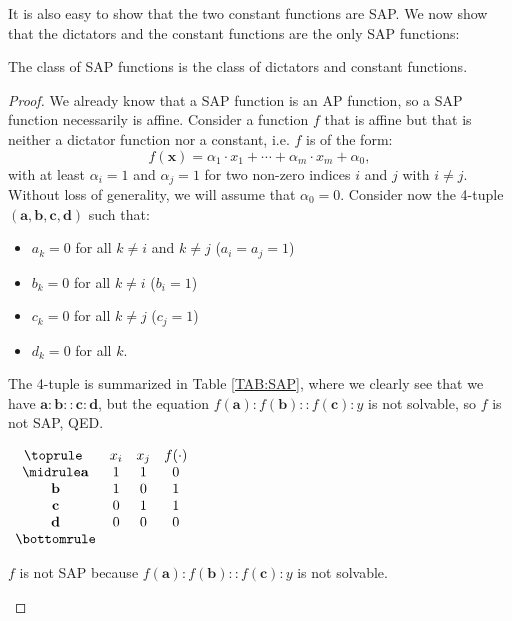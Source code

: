 It is also easy to show that the two constant functions are SAP. We now show
that the dictators and the constant functions are the only SAP functions:

\begin{proposition}
  The class of SAP functions is the class of dictators and constant functions.
\end{proposition}
\begin{proof}
  We already know that a SAP function is an AP function, so a SAP function
  necessarily is affine. Consider a function $f$ that is affine but that is
  neither a dictator function nor a constant, i.e. $f$ is of the form:
  $$f(\mathbf{x}) = \alpha_1 \cdot x_1 + \cdots +\alpha_m \cdot x_m + \alpha_0,$$
  with at least $\alpha_i = 1$ and $\alpha_j = 1$ for two non-zero indices $i$ and $j$
  with $i\neq j$. Without loss of generality, we will assume that
  $\alpha_0 = 0$.
  Consider now the 4-tuple $(\mathbf{a}, \mathbf{b}, \mathbf{c},
  \mathbf{d})$ such that:
  \begin{itemize}
    \item $a_k = 0$ for all $k \neq i$ and $k\neq j$ ($a_i = a_j = 1$)
    \item $b_k = 0$ for all $k \neq i$ ($b_i = 1$)
    \item $c_k = 0$ for all $k \neq j$ ($c_j = 1$)
    \item $d_k = 0$ for all $k$.
  \end{itemize}

  The 4-tuple is summarized in Table \ref{TAB:SAP}, where we clearly see
  that we have $\mathbf{a} : \mathbf{b} :: \mathbf{c} : \mathbf{d}$, but the
  equation $f(\mathbf{a}) : f(\mathbf{b}) :: f(\mathbf{c}) : y$ is not
  solvable,
  so $f$ is not SAP, QED.

\begin{table}[ht]
  \center
$\begin{array}{cccc}
  \toprule
  ~ & x_i & x_j & f(\cdot) \\
  \midrule
  \mathbf{a} & 1 & 1 & 0\\
  \mathbf{b} & 1 & 0 & 1\\
  \mathbf{c} & 0 & 1 & 1\\
  \mathbf{d} & 0 & 0 & 0\\
  \bottomrule
\end{array}
$\bigskip
\caption{$f$ is not SAP because $f(\mathbf{a}) : f(\mathbf{b}) :: f(\mathbf{c})
  : y$ is not solvable.}
\label{TAB:SAP}
\end{table}

\end{proof}

